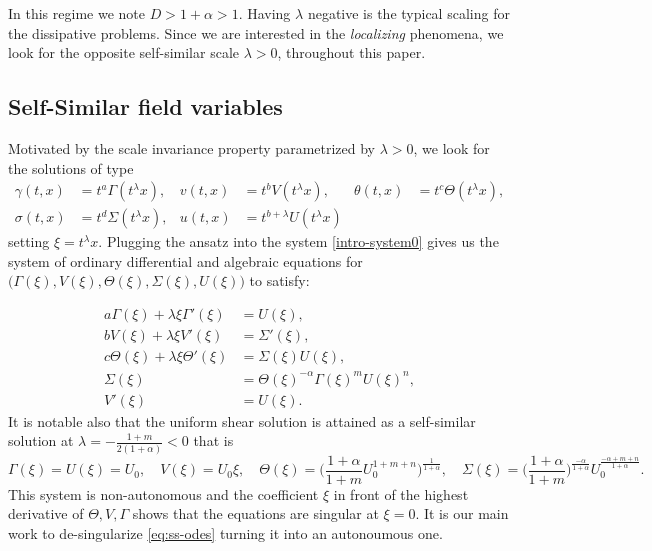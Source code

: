\documentclass[a4paper,11pt]{article}
\theoremstyle{remark}
\begin{document}
In this regime we note $D>1+\alpha>1$. Having $\lambda$ negative is the typical scaling for the dissipative problems. Since we are interested in the {\it localizing} phenomena, we look for the opposite self-similar scale $\lambda>0$, throughout this paper. %

\subsection{Self-Similar field variables}
Motivated by the scale invariance property parametrized by $\lambda>0$, we look for the solutions of type
\begin{equation}\label{eq:ORItoCAP}
\begin{aligned}
 \gamma(t,x) &= t^a\Gamma(t^\lambda x), & v(t,x) &= t^b V(t^\lambda x), &\theta(t,x) &= t^c \Theta(t^\lambda x),\\
 \sigma(t,x) &= t^d \Sigma(t^\lambda x), & u(t,x) &= t^{b+\lambda} U(t^\lambda x)
\end{aligned}
\end{equation}
setting $\xi = t^\lambda x$. Plugging the ansatz into the system \eqref{intro-system0} gives us the system of ordinary differential and algebraic equations for $\big(\Gamma(\xi), V(\xi), \Theta(\xi), \Sigma(\xi), U(\xi)\big)$ to satisfy:

\begin{equation}
\begin{aligned}
 a \Gamma(\xi) + \lambda \xi \Gamma'(\xi) &= U(\xi),\\
 b V(\xi) + \lambda \xi V'(\xi) &= \Sigma'(\xi),\\
 c \Theta(\xi) + \lambda \xi \Theta'(\xi)&=\Sigma(\xi) U(\xi),\\
 \Sigma(\xi) &= \Theta(\xi)^{-\alpha} \Gamma(\xi)^m U(\xi)^n,\\
 V'(\xi)&=U(\xi).
\end{aligned} \label{eq:ss-odes}
\end{equation}
It is notable also that the uniform shear solution is attained as a self-similar solution at $\lambda = -\frac{1+m}{2(1+\alpha)}<0$ that is
\begin{equation*}
 \Gamma(\xi) = U(\xi)=U_0, \quad V(\xi) = U_0\xi, \quad  \Theta(\xi) = \Big( \frac{1+\alpha}{1+m} U_0^{1+m+n}\Big)^{\frac{1}{1+\alpha}}, \quad \Sigma(\xi) = \Big(\frac{1+\alpha}{1+m}\Big)^{\frac{-\alpha}{1+\alpha}} U_0^{\frac{-\alpha+m+n}{1+\alpha}}.
\end{equation*}
This system is non-autonomous and the coefficient $\xi$ in front of the highest derivative of $\Theta, V, \Gamma$ shows that the equations are singular at $\xi=0$.
It is our main work to de-singularize \eqref{eq:ss-odes} turning it into an autonoumous one.
\end{document}
